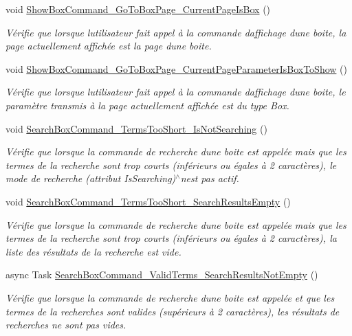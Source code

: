 \begin{DoxyCompactItemize}
void \hyperlink{class_boxes_1_1_tests_1_1_discover_view_model_tests_ace2a5bcc2ce02ed83d16ceb9ea333637}{Show\+Box\+Command\+\_\+\+Go\+To\+Box\+Page\+\_\+\+Current\+Page\+Is\+Box} ()
\begin{DoxyCompactList}\small\item\em Vérifie que lorsque l\textquotesingle{}utilisateur fait appel à la commande d\textquotesingle{}affichage d\textquotesingle{}une boite, la page actuellement affichée est la page d\textquotesingle{}une boite. \end{DoxyCompactList}\item 
void \hyperlink{class_boxes_1_1_tests_1_1_discover_view_model_tests_aa269a254cf2c6e6ed49453798d9059cb}{Show\+Box\+Command\+\_\+\+Go\+To\+Box\+Page\+\_\+\+Current\+Page\+Parameter\+Is\+Box\+To\+Show} ()
\begin{DoxyCompactList}\small\item\em Vérifie que lorsque l\textquotesingle{}utilisateur fait appel à la commande d\textquotesingle{}affichage d\textquotesingle{}une boite, le paramètre transmis à la page actuellement affichée est du type Box. \end{DoxyCompactList}\item 
void \hyperlink{class_boxes_1_1_tests_1_1_discover_view_model_tests_a003f47630cda3a64c7f84749888e3e31}{Search\+Box\+Command\+\_\+\+Terms\+Too\+Short\+\_\+\+Is\+Not\+Searching} ()
\begin{DoxyCompactList}\small\item\em Vérifie que lorsque la commande de recherche d\textquotesingle{}une boite est appelée mais que les termes de la recherche sont trop courts (inférieurs ou égales à 2 caractères), le mode de recherche (attribut {\ttfamily Is\+Searching})$^\wedge$n\textquotesingle{}est pas actif. \end{DoxyCompactList}\item 
void \hyperlink{class_boxes_1_1_tests_1_1_discover_view_model_tests_a58653decea4a3beac3885b01c6e72ddc}{Search\+Box\+Command\+\_\+\+Terms\+Too\+Short\+\_\+\+Search\+Results\+Empty} ()
\begin{DoxyCompactList}\small\item\em Vérifie que lorsque la commande de recherche d\textquotesingle{}une boite est appelée mais que les termes de la recherche sont trop courts (inférieurs ou égales à 2 caractères), la liste des résultats de la recherche est vide. \end{DoxyCompactList}\item 
async Task \hyperlink{class_boxes_1_1_tests_1_1_discover_view_model_tests_a314bbed2abeaba2244813785bf3270d1}{Search\+Box\+Command\+\_\+\+Valid\+Terms\+\_\+\+Search\+Results\+Not\+Empty} ()
\begin{DoxyCompactList}\small\item\em Vérifie que lorsque la commande de recherche d\textquotesingle{}une boite est appelée et que les termes de la recherches sont valides (supérieurs à 2 caractères), les résultats de recherches ne sont pas vides. \end{DoxyCompactList}\end{DoxyCompactItemize}
